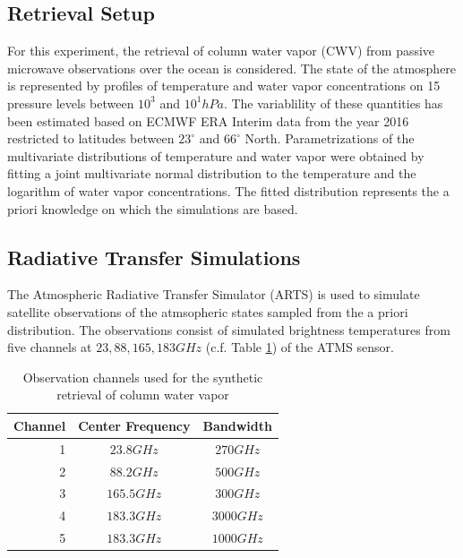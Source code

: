 \documentclass[journal abbreviation, manuscript]{copernicus}
\begin{document}
\subsection{Retrieval Setup}

   For this experiment, the retrieval of column water vapor (CWV) from passive
   microwave observations over the ocean is considered. The state of the
   atmosphere is represented by profiles of temperature and water vapor
   concentrations on 15 pressure levels between $10^3$ and $10^1\unit{hPa}$. The
   variablility of these quantities has been estimated based on ECMWF ERA
   Interim data \citep{era_interim} from the year 2016 restricted to latitudes
   between $23^\circ$ and $66^\circ$ North. Parametrizations of the multivariate
   distributions of temperature and water vapor were obtained by fitting a joint
   multivariate normal distribution to the temperature and the logarithm of
   water vapor concentrations. The fitted distribution represents the a priori
   knowledge on which the simulations are based.

\subsection{Radiative Transfer Simulations}

   The Atmospheric Radiative Transfer Simulator (ARTS) \citep{arts} is used to
   simulate satellite observations of the atmsopheric states sampled from the a
   priori distribution. The observations consist of simulated brightness
   temperatures from five channels at $23, 88, 165, 183 \unit{GHz}$
   (c.f. Table \ref{tab:channels}) of the ATMS sensor.

\begin{table}[hbpt]
\centering
\begin{tabular}{|r|c|c|}
    \hline
    Channel & Center Frequency           & Bandwidth                \\ 
    \hline
                  1 & $23.8 \unit{GHz}$ & $270 \unit{GHz}$ \\
                  2 & $88.2 \unit{GHz}$ & $500 \unit{GHz}$ \\
                  3 & $165.5\unit{GHz}$ & $300 \unit{GHz}$ \\
                  4 & $183.3\unit{GHz}$ & $3000\unit{GHz}$ \\
                  5 & $183.3\unit{GHz}$ & $1000\unit{GHz}$ \\
    \hline
\end{tabular}
\caption{Observation channels used for the synthetic retrieval of column water vapor}
\label{tab:channels}
\end{table}
\end{document}
